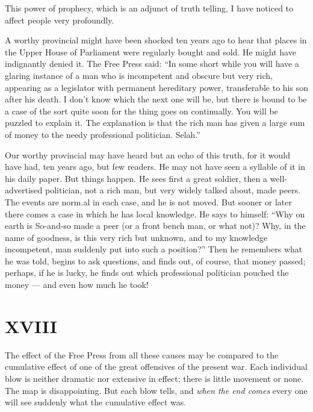 \documentclass{book}
\begin{document}
This power of prophecy, which is an adjunct of truth telling, I have noticed to affect people very profoundly.

A worthy provincial might have been shocked ten years ago to hear that places in the Upper House of Parliament were regularly bought and sold. He might have indignantly denied it. The Free Press said: “In some short while you will have a glaring instance of a man who is incompetent and obscure but very rich, appearing as a legislator with permanent hereditary power, transferable to his son after his death. I don’t know which the next one will be, but there is bound to be a case of the sort quite soon for the thing goes on continually. You will be puzzled to explain it. The explanation is that the rich man has given a large sum of money to the needy professional politician. Selah.”

Our worthy provincial may have heard but an echo of this truth, for it would have had, ten years ago, but few readers. He may not have seen a syllable of it in his daily paper. But things happen. He sees first a great soldier, then a well-advertised politician, not a rich man, but very widely talked about, made peers. The events are norm.al in each case, and he is not moved. But sooner or later there comes a case in which he has local knowledge. He says to himself: “Why on earth is So-and-so made a peer (or a front bench man, or what not)? Why, in the name of goodness, is this very rich but unknown, and to my knowledge incompetent, man suddenly put into such a position?” Then he remembers what he was told, begins to ask questions, and finds out, of course, that money passed; perhaps, if he is lucky, he finds out which professional politician pouched the money — and even how much he took!

\chapter*{XVIII}
\label{chapter-19}
The effect of the Free Press from all these causes may be compared to the cumulative effect of one of the great offensives of the present war. Each individual blow is neither dramatic nor extensive in effect; there is little movement or none. The map is disappointing. But each blow tells, and \emph{when the end comes} every one will see suddenly what the cumulative effect was.
\end{document}
